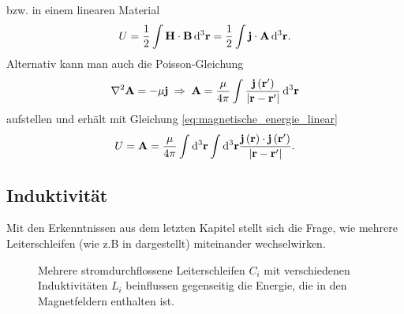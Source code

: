 bzw. in einem linearen Material
\begin{equation}
	\label{eq:magnetische_energie_linear}
	U=\frac{1}{2}\int \mathbf{H}\cdot \mathbf{B}\mathop{}\!\mathrm{d} ^{3}\mathbf{r}=\frac{1}{2}\int \mathbf{j}\cdot \mathbf{A}\mathop{}\!\mathrm{d} ^{3}\mathbf{r}.
\end{equation}
Alternativ kann man auch die Poisson-Gleichung
\begin{equation*}
	\nabla ^{2}\mathbf{A}=-\mu \mathbf{j}\;\Rightarrow\; \mathbf{A}=\frac{\mu }{4\pi }\int \frac{\mathbf{j}\left(\mathbf{r}'\right)}{\left| \mathbf{r}-\mathbf{r}'\right| }\mathop{}\!\mathrm{d} ^{3}\mathbf{r}
\end{equation*}
aufstellen und erhält mit Gleichung \eqref{eq:magnetische_energie_linear}
\begin{equation*}
	U=\mathbf{A}=\frac{\mu }{4\pi }\int \mathop{}\!\mathrm{d} ^{3}\mathbf{r}\int \mathop{}\!\mathrm{d} ^{3}\mathbf{r}\frac{\mathbf{j}\left(\mathbf{r}\right)\cdot \mathbf{j}\left(\mathbf{r}'\right)}{\left| \mathbf{r}-\mathbf{r}'\right| }.
\end{equation*}

\subsection{Induktivität}

Mit den Erkenntnissen aus dem letzten Kapitel stellt sich die Frage, wie mehrere Leiterschleifen (wie z.B in  dargestellt) miteinander wechselwirken. 

\begin{figure}[ht]
	\centering
	\tfigTwoInductors
	\caption{Mehrere stromdurchflossene Leiterschleifen $C_i$ mit verschiedenen Induktivitäten $L_i$ beinflussen gegenseitig die Energie, die in den Magnetfeldern enthalten ist. }
	\label{fig:TwoInductors}
\end{figure}

